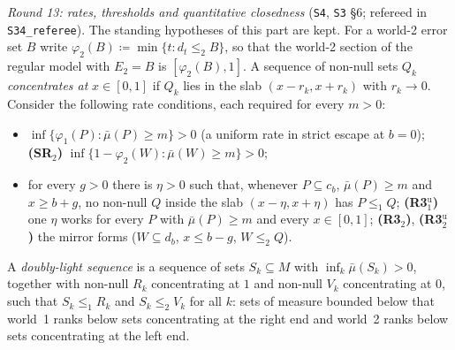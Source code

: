\documentclass[11pt]{article}
\theoremstyle{definition}
\theoremstyle{remark}
\newcommand{\src}[1]{\texttt{#1}}
\begin{document}
\emph{Round 13: rates, thresholds and quantitative closedness} (\src{S4}, \src{S3} \S6; refereed in \src{S34\_referee}). The standing hypotheses of this part are kept. For a world-2 error set $B$ write $\varphi_2(B)\coloneqq\min\{t:d_t\le_2B\}$, so that the world-2 section of the regular model with $E_2=B$ is $[\varphi_2(B),1]$. A sequence of non-null sets $Q_k$ \emph{concentrates at} $x\in[0,1]$ if $Q_k$ lies in the slab $(x-r_k,x+r_k)$ with $r_k\to0$. Consider the following rate conditions, each required for every $m>0$:
\begin{itemize}[leftmargin=*]
\item[\textbf{(SR$_1$)}] $\inf\{\varphi_1(P):\bar\mu(P)\ge m\}>0$ (a uniform rate in strict escape at $b=0$); \textbf{(SR$_2$)} $\inf\{1-\varphi_2(W):\bar\mu(W)\ge m\}>0$;
\item[\textbf{(R3$_1$)}] for every $g>0$ there is $\eta>0$ such that, whenever $P\subseteq c_b$, $\bar\mu(P)\ge m$ and $x\ge b+g$, no non-null $Q$ inside the slab $(x-\eta,x+\eta)$ has $P\le_1Q$; \textbf{(R3$_1^{\mathrm u}$)} one $\eta$ works for every $P$ with $\bar\mu(P)\ge m$ and every $x\in[0,1]$; \textbf{(R3$_2$)}, \textbf{(R3$_2^{\mathrm u}$)} the mirror forms ($W\subseteq d_b$, $x\le b-g$, $W\le_2Q$).
\end{itemize}
A \emph{doubly-light sequence} is a sequence of sets $S_k\subseteq M$ with $\inf_k\bar\mu(S_k)>0$, together with non-null $R_k$ concentrating at $1$ and non-null $V_k$ concentrating at $0$, such that $S_k\le_1R_k$ and $S_k\le_2V_k$ for all $k$: sets of measure bounded below that world~1 ranks below sets concentrating at the right end and world~2 ranks below sets concentrating at the left end.
\end{document}
